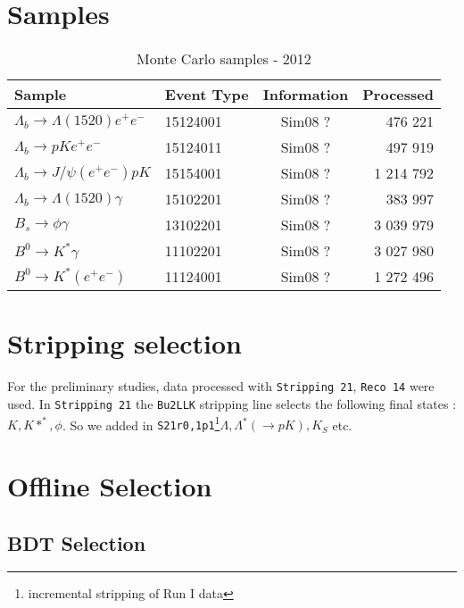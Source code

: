 \documentclass[11pt, oneside]{article}   	%
\begin{document}
\section {Samples}
\label{sec:samples}
\begin{table}[h]
\centering
\begin{tabular}{llcr}
Sample& Event Type  & Information & Processed \\

\hline
$\Lambda_b\to \Lambda(1520) e^+e^-$ & 15124001 & Sim08 ? & 476 221 \\
$\Lambda_b\to pK e^+e^-$&15124011  &  Sim08 ? & 497 919 \\
$\Lambda_b\to J/\psi (e^+e^-)pK $&15154001  & Sim08 ?  & 1 214 792\\
$\Lambda_b\to \Lambda(1520) \gamma $ &15102201 &  Sim08 ? &383 997 \\
\hline 
$ B_s\to \phi \gamma$& 13102201 &  Sim08 ?  &   3 039 979\\

$B^0 \to K^* \gamma $ &11102201 &  Sim08 ? & 3 027 980\\

$ B^0 \to K^* (e^+e^-)$ &  11124001& Sim08 ?  &  1 272 496\\
\end{tabular}
\caption {Monte Carlo samples  - 2012 }
\end{table}

\section {Stripping selection}
\label{sec:stripping}
For the preliminary studies, data processed with  {\tt Stripping 21}, {\tt Reco 14} were used. 
In {\tt Stripping 21} the {\tt Bu2LLK}  stripping line selects the following  final states : $K, K*^*, \phi$. So we added in {\tt S21r0,1p1}\footnote{ incremental stripping of Run I data}$ \Lambda, \Lambda^*(\to pK ), K_S $ etc.



\section{Offline Selection}
\subsection{BDT Selection}
\label{sec:bdt}
\end{document}
